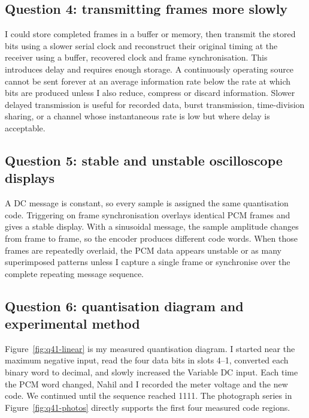 \documentclass[11pt,a4paper]{article}
\begin{document}
\subsection{Question 4: transmitting frames more slowly}
\begin{answerbox}
I could store completed frames in a buffer or memory, then transmit the stored bits using a slower serial clock and reconstruct their original timing at the receiver using a buffer, recovered clock and frame synchronisation. This introduces delay and requires enough storage. A continuously operating source cannot be sent forever at an average information rate below the rate at which bits are produced unless I also reduce, compress or discard information. Slower delayed transmission is useful for recorded data, burst transmission, time-division sharing, or a channel whose instantaneous rate is low but where delay is acceptable.
\end{answerbox}

\subsection{Question 5: stable and unstable oscilloscope displays}
\begin{answerbox}
A DC message is constant, so every sample is assigned the same quantisation code. Triggering on frame synchronisation overlays identical PCM frames and gives a stable display. With a sinusoidal message, the sample amplitude changes from frame to frame, so the encoder produces different code words. When those frames are repeatedly overlaid, the PCM data appears unstable or as many superimposed patterns unless I capture a single frame or synchronise over the complete repeating message sequence.
\end{answerbox}

\subsection{Question 6: quantisation diagram and experimental method}
\begin{answerbox}
Figure~\ref{fig:q41-linear} is my measured quantisation diagram. I started near the maximum negative input, read the four data bits in slots 4--1, converted each binary word to decimal, and slowly increased the Variable DC input. Each time the PCM word changed, Nahil and I recorded the meter voltage and the new code. We continued until the sequence reached 1111. The photograph series in Figure~\ref{fig:q41-photos} directly supports the first four measured code regions.
\end{answerbox}
\end{document}
